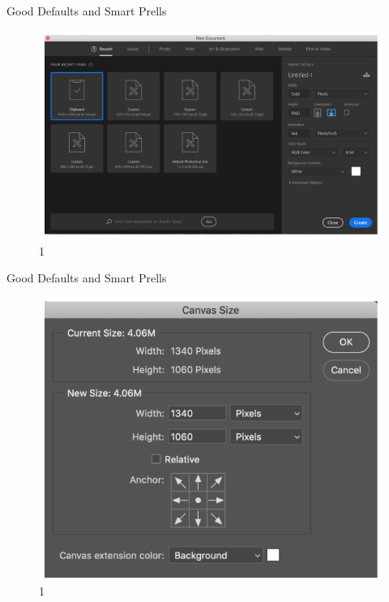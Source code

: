 \documentclass{beamer}
\begin{document}
\begin{frame}[t]{Good Defaults and Smart Prells}
	\begin{figure}[h]
		\centering
		\includegraphics[scale=0.6]{images/lec08-pic61.png}
		\caption{1}
	\end{figure}
\end{frame}

\begin{frame}[t]{Good Defaults and Smart Prells}
	\begin{figure}[h]
		\centering
		\includegraphics[scale=0.6]{images/lec08-pic62.png}
		\caption{1}
	\end{figure}
\end{frame}
\end{document}
